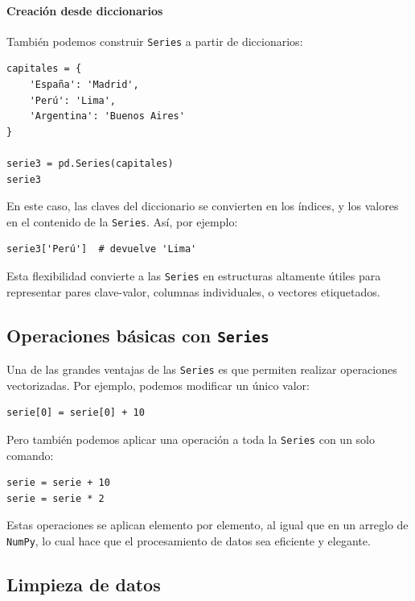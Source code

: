 \documentclass{article}
\theoremstyle{nonumberplain}
\begin{document}
\paragraph{Creación desde diccionarios}

También podemos construir \texttt{Series} a partir de diccionarios:

\begin{verbatim}
capitales = {
    'España': 'Madrid',
    'Perú': 'Lima',
    'Argentina': 'Buenos Aires'
}

serie3 = pd.Series(capitales)
serie3
\end{verbatim}

En este caso, las claves del diccionario se convierten en los índices, y los valores en el contenido de la \texttt{Series}. Así, por ejemplo:

\begin{verbatim}
serie3['Perú']  # devuelve 'Lima'
\end{verbatim}

Esta flexibilidad convierte a las \texttt{Series} en estructuras altamente útiles para representar pares clave-valor, columnas individuales, o vectores etiquetados.

\subsection*{Operaciones básicas con \texttt{Series}}

Una de las grandes ventajas de las \texttt{Series} es que permiten realizar operaciones vectorizadas. Por ejemplo, podemos modificar un único valor:

\begin{verbatim}
serie[0] = serie[0] + 10
\end{verbatim}

Pero también podemos aplicar una operación a toda la \texttt{Series} con un solo comando:

\begin{verbatim}
serie = serie + 10
serie = serie * 2
\end{verbatim}

Estas operaciones se aplican elemento por elemento, al igual que en un arreglo de \texttt{NumPy}, lo cual hace que el procesamiento de datos sea eficiente y elegante.

\subsection*{Limpieza de datos}
\end{document}
